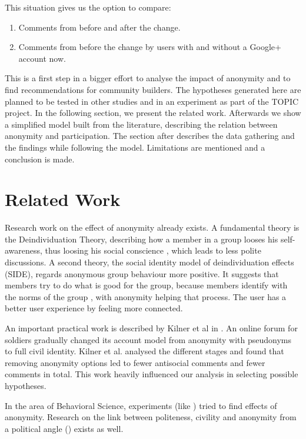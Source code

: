 \documentclass{chi-ext2}
\begin{document}
This situation gives us the option to compare: 
\begin{enumerate}
\item Comments from before and after the change.
\item Comments from before the change by users with and without a Google+ account now.
\end{enumerate}

This is a first step in a bigger effort to analyse the impact of anonymity and to find recommendations for community builders. The hypotheses generated here are planned to be tested in other studies and in an experiment as part of the TOPIC project. In the following section, we present the related work. Afterwards we show a simplified model built from the literature, describing the relation between anonymity and participation. The section after describes the data gathering and the findings while following the model. Limitations are mentioned and a conclusion is made.

\section{Related Work}

Research work on the effect of anonymity already exists. A fundamental theory is the Deindividuation Theory, describing how a member in a group looses his self-awareness, thus loosing his social conscience \cite{anonIntergroup}, which leads to less polite discussions. A second theory, the social identity model of deindividuation effects (SIDE), regards anonymous group behaviour more positive. It suggests that members try to do what is good for the group, because members identify with the norms of the group \cite{SidePortraits}, with anonymity helping that process. The user has a better user experience by feeling more connected.

An important practical work is described by Kilner et al in \cite{CoPAnonymity}. An online forum for soldiers gradually changed its account model from anonymity with pseudonyms to full civil identity. Kilner et al. analysed the different stages and found that removing anonymity options led to fewer antisocial comments and fewer comments in total. This work heavily influenced our analysis in selecting possible hypotheses.

In the area of Behavioral Science, experiments (like \cite{anonymityDisinhibition}) tried to find effects of anonymity. Research on the link between politeness, civility and anonymity from a political angle (\cite{santana2012civility}) exists as well.
\end{document}
